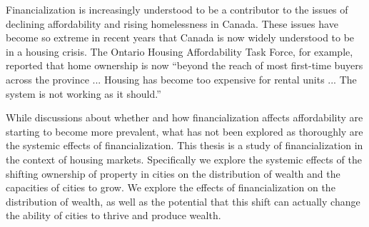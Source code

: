 Financialization is increasingly understood to be a contributor  to the issues of declining affordability and rising homelessness in Canada. These issues have become so extreme in recent years that Canada is now widely understood to be in a housing crisis. The Ontario Housing Affordability Task Force, for example, reported that home ownership is now ``beyond the reach of most first-time buyers across the province ... Housing has become too expensive for rental units ... The system is not working as it should.''

While discussions about whether and how financialization affects affordability are starting to become more prevalent, what has not been explored as thoroughly are the systemic effects of financialization.  %
This thesis is a study of financialization in the context of housing markets. Specifically we explore the systemic effects of the shifting ownership of property in cities on the distribution of wealth and the capacities of cities to grow. We explore the effects of financialization on the distribution of wealth, as well as the potential that this shift can actually change the ability of cities to thrive and produce wealth. 
 






